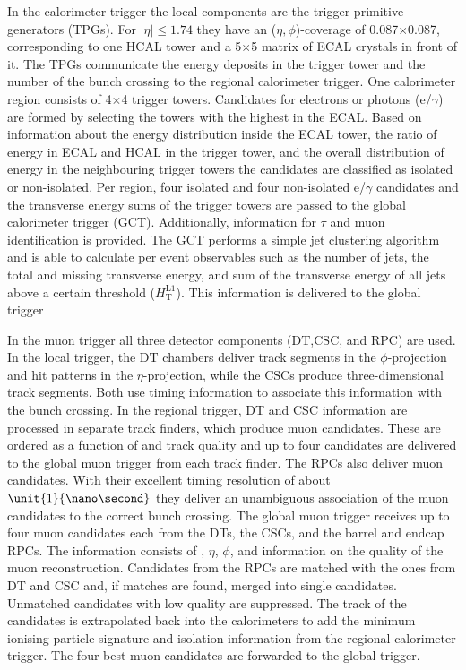 In the calorimeter trigger the local components are the trigger primitive generators (TPGs). For $\vert \eta \vert \leq 1.74$ they have an ($\eta,\phi$)-coverage of 0.087$\times$0.087, corresponding to one HCAL tower and a 5$\times$5 matrix of ECAL crystals in front of it. The TPGs communicate the energy deposits in the trigger tower and the number of the bunch crossing to the regional calorimeter trigger. One calorimeter region consists of 4$\times$4 trigger towers. Candidates for electrons or photons (e/$\gamma$) are formed by selecting the towers with the highest \Et in the ECAL. Based on information about the energy distribution inside the ECAL tower, the ratio of energy in ECAL and HCAL in the trigger tower, and the overall distribution of energy in the neighbouring trigger towers the candidates are classified as isolated or non-isolated. Per region, four isolated and four non-isolated e/$\gamma$ candidates and the transverse energy sums of the trigger towers are passed to the global calorimeter trigger (GCT). Additionally, information for $\tau$ and muon identification is provided. The GCT performs a simple jet clustering algorithm and is able to calculate per event observables such as the number of jets, the total and missing transverse energy, and sum of the transverse energy of all jets above a certain threshold ($H_{\mathrm{T}}^{\mathrm{L1}}$). This information is delivered to the global trigger

In the muon trigger all three detector components (DT,CSC, and RPC) are used. In the local trigger, the DT chambers deliver track segments in the $\phi$-projection and hit patterns in the $\eta$-projection, while the CSCs produce three-dimensional track segments. Both use timing information to associate this information with the bunch crossing. In the regional trigger, DT and CSC information are processed in separate track finders, which produce muon candidates. These are ordered as a function of \pt and track quality and up to four candidates are delivered to the global muon trigger from each track finder. The RPCs also deliver muon candidates. With their excellent timing resolution of about $\unit{1}{\nano\second}$ they deliver an unambiguous association of the muon candidates to the correct bunch crossing. The global muon trigger receives up to four muon candidates each from the DTs, the CSCs, and the barrel and endcap RPCs. The information consists of \pt, $\eta$, $\phi$, and information on the quality of the muon reconstruction. Candidates from the RPCs are matched with the ones from DT and CSC and, if matches are found, merged into single candidates. Unmatched candidates with low quality are suppressed. The track of the candidates is extrapolated back into the calorimeters to add the minimum ionising particle signature and isolation information from the regional calorimeter trigger. The four best muon candidates are forwarded to the global trigger. 

